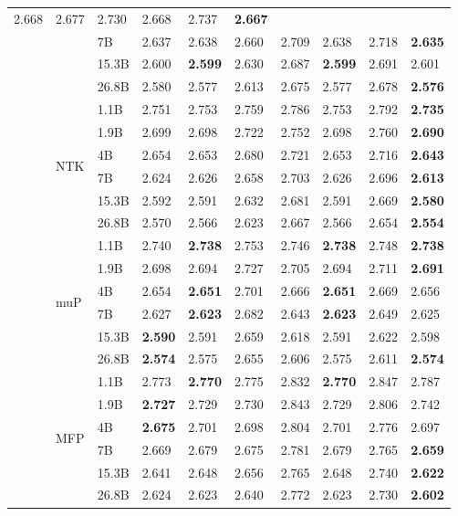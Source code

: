 \begin{table}[h!]
{\begin{tabularx}{1.65\textwidth}{XXX | XXXXXXX}
2.668 & 2.677 & 2.730 & 2.668 & 2.737 & \textbf{2.667} \\ &  & 7B & 2.637 & 2.638 & 2.660 & 2.709 & 2.638 & 2.718 & \textbf{2.635} \\ &  & 15.3B & 2.600 & \textbf{2.599} & 2.630 & 2.687 & \textbf{2.599} & 2.691 & 2.601 \\ &  & 26.8B & 2.580 & 2.577 & 2.613 & 2.675 & 2.577 & 2.678 & \textbf{2.576} \\  \cmidrule{2-10}  & \multirow{6}{*}{\Large NTK } & 1.1B & 2.751 & 2.753 & 2.759 & 2.786 & 2.753 & 2.792 & \textbf{2.735} \\ &  & 1.9B & 2.699 & 2.698 & 2.722 & 2.752 & 2.698 & 2.760 & \textbf{2.690} \\ &  & 4B & 2.654 & 2.653 & 2.680 & 2.721 & 2.653 & 2.716 & \textbf{2.643} \\ &  & 7B & 2.624 & 2.626 & 2.658 & 2.703 & 2.626 & 2.696 & \textbf{2.613} \\ &  & 15.3B & 2.592 & 2.591 & 2.632 & 2.681 & 2.591 & 2.669 & \textbf{2.580} \\ &  & 26.8B & 2.570 & 2.566 & 2.623 & 2.667 & 2.566 & 2.654 & \textbf{2.554} \\  \cmidrule{2-10}  & \multirow{6}{*}{\Large muP } & 1.1B & 2.740 & \textbf{2.738} & 2.753 & 2.746 & \textbf{2.738} & 2.748 & \textbf{2.738} \\ &  & 1.9B & 2.698 & 2.694 & 2.727 & 2.705 & 2.694 & 2.711 & \textbf{2.691} \\ &  & 4B & 2.654 & \textbf{2.651} & 2.701 & 2.666 & \textbf{2.651} & 2.669 & 2.656 \\ &  & 7B & 2.627 & \textbf{2.623} & 2.682 & 2.643 & \textbf{2.623} & 2.649 & 2.625 \\ &  & 15.3B & \textbf{2.590} & 2.591 & 2.659 & 2.618 & 2.591 & 2.622 & 2.598 \\ &  & 26.8B & \textbf{2.574} & 2.575 & 2.655 & 2.606 & 2.575 & 2.611 & \textbf{2.574} \\  \cmidrule{2-10}  & \multirow{6}{*}{\Large MFP } & 1.1B & 2.773 & \textbf{2.770} & 2.775 & 2.832 & \textbf{2.770} & 2.847 & 2.787 \\ &  & 1.9B & \textbf{2.727} & 2.729 & 2.730 & 2.843 & 2.729 & 2.806 & 2.742 \\ &  & 4B & \textbf{2.675} & 2.701 & 2.698 & 2.804 & 2.701 & 2.776 & 2.697 \\ &  & 7B & 2.669 & 2.679 & 2.675 & 2.781 & 2.679 & 2.765 & \textbf{2.659} \\ &  & 15.3B & 2.641 & 2.648 & 2.656 & 2.765 & 2.648 & 2.740 & \textbf{2.622} \\ &  & 26.8B & 2.624 & 2.623 & 2.640 & 2.772 & 2.623 & 2.730 & \textbf{2.602} \\ 
\bottomrule[1.5\heavyrulewidth]
\end{tabularx}}
\end{table}
\endgroup


